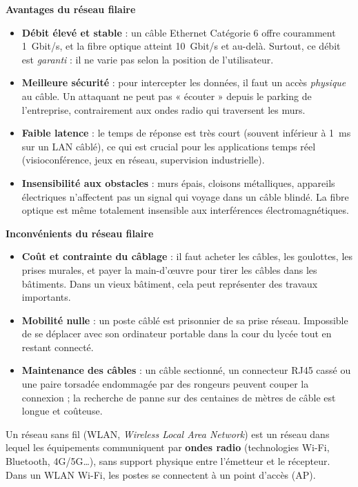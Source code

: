 \documentclass[11pt]{article}
\newcommand{\cle}[1]{{\popxbold\color{popdark}#1}}
\newcounter{popsec}
\newcounter{popsub}
\newcommand{\courssub}[1]{%
  \stepcounter{popsub}%
  \par\vspace{9pt}\noindent{\popxbold\fontsize{11.5}{13}\selectfont\color{popink}{\color{poporange}\thepopsec.\thepopsub}\hspace{6pt}#1}\par\nopagebreak\vspace{4pt}
}
\begin{document}
\textbf{Avantages du réseau filaire}

\begin{itemize}
\item \textbf{Débit élevé et stable} : un câble Ethernet Catégorie 6 offre couramment \SI{1}{Gbit/s}, et la fibre optique atteint \SI{10}{Gbit/s} et au-delà. Surtout, ce débit est \emph{garanti} : il ne varie pas selon la position de l'utilisateur.
\item \textbf{Meilleure sécurité} : pour intercepter les données, il faut un accès \emph{physique} au câble. Un attaquant ne peut pas « écouter » depuis le parking de l'entreprise, contrairement aux ondes radio qui traversent les murs.
\item \textbf{Faible latence} : le temps de réponse est très court (souvent inférieur à \SI{1}{ms} sur un LAN câblé), ce qui est crucial pour les applications temps réel (visioconférence, jeux en réseau, supervision industrielle).
\item \textbf{Insensibilité aux obstacles} : murs épais, cloisons métalliques, appareils électriques n'affectent pas un signal qui voyage dans un câble blindé. La fibre optique est même totalement insensible aux interférences électromagnétiques.
\end{itemize}

\textbf{Inconvénients du réseau filaire}

\begin{itemize}
\item \textbf{Coût et contrainte du câblage} : il faut acheter les câbles, les goulottes, les prises murales, et payer la main-d'œuvre pour tirer les câbles dans les bâtiments. Dans un vieux bâtiment, cela peut représenter des travaux importants.
\item \textbf{Mobilité nulle} : un poste câblé est prisonnier de sa prise réseau. Impossible de se déplacer avec son ordinateur portable dans la cour du lycée tout en restant connecté.
\item \textbf{Maintenance des câbles} : un câble sectionné, un connecteur RJ45 cassé ou une paire torsadée endommagée par des rongeurs peuvent couper la connexion ; la recherche de panne sur des centaines de mètres de câble est longue et coûteuse.
\end{itemize}

\courssub{Le réseau sans fil : liberté et limites}

\begin{definition}
Un \cle{réseau sans fil} (WLAN, \emph{Wireless Local Area Network}) est un réseau dans lequel les équipements communiquent par \textbf{ondes radio} (technologies Wi-Fi, Bluetooth, 4G/5G\ldots), sans support physique entre l'émetteur et le récepteur. Dans un WLAN Wi-Fi, les postes se connectent à un \cle{point d'accès} (AP).
\end{definition}
\end{document}
